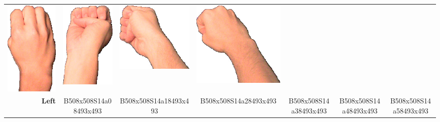 \documentclass{article}
\begin{document}
\begin{center}
\begin{tabular}{r*{6}{c}}
\includegraphics[scale=0.1]{images/04-04-3.jpg}&
\includegraphics[scale=0.1]{images/04-04-4.jpg}&
\includegraphics[scale=0.1]{images/04-04-5.jpg}&
\includegraphics[scale=0.1]{images/04-04-6.jpg}\\
\textbf{Left}&
B508x508S14a08493x493&
B508x508S14a18493x493&
B508x508S14a28493x493&
B508x508S14a38493x493&
B508x508S14a48493x493&
B508x508S14a58493x493\\
\end{tabular}
\end{center}
\end{document}
